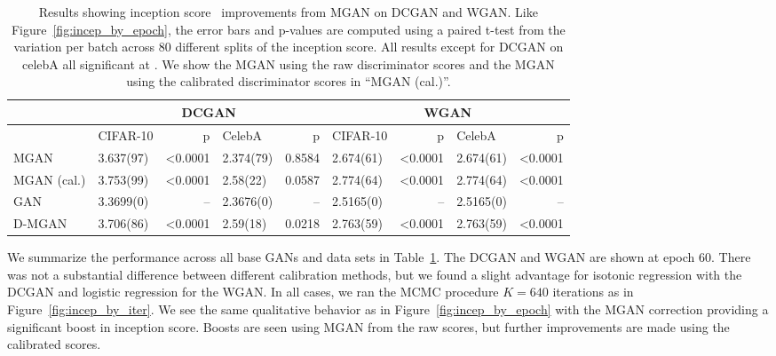 \documentclass{article}
\begin{document}
\begin{table}[htbp]
\centering
    \caption{{\small
    Results showing inception score~\citep{Salimans2016} improvements from MGAN on DCGAN and WGAN\@.
    Like Figure~\ref{fig:incep_by_epoch}, the error bars and p-values are computed using a paired t-test from the variation per batch across 80 different splits of the inception score.
    All results except for DCGAN on celebA all significant at .
    We show the MGAN using the raw discriminator scores and the MGAN using the calibrated discriminator scores in ``MGAN (cal.)''.
    }}
    \label{tbl:inception}
{\scriptsize
\begin{tabular}{|l|l|r|l|r||l|r|l|r|}
\toprule
~                 & \multicolumn{4}{c}{DCGAN}                               & \multicolumn{4}{c}{WGAN} \\
\toprule
~                 & CIFAR-10         &      p   & CelebA         &      p   & CIFAR-10        &      p   & CelebA        &      p \\
\midrule
MGAN              &        3.637(97) &  <0.0001 &      2.374(79) &  0.8584  &       2.674(61) &  <0.0001 &     2.674(61) &  <0.0001 \\
MGAN (cal.)       &        3.753(99) &  <0.0001 &      2.58(22)  &  0.0587  &       2.774(64) &  <0.0001 &     2.774(64) &  <0.0001 \\
GAN               &        3.3699(0) &       -- &      2.3676(0) &      --  &       2.5165(0) &       -- &     2.5165(0) &       -- \\
D-MGAN            &        3.706(86) &  <0.0001 &      2.59(18)  &  0.0218  &       2.763(59) &  <0.0001 &     2.763(59) &  <0.0001 \\
\bottomrule
\end{tabular}
}
\end{table}

We summarize the performance across all base GANs and data sets in Table~\ref{tbl:inception}.
The DCGAN and WGAN are shown at epoch 60.
There was not a substantial difference between different calibration methods, but we found a slight advantage for isotonic regression with the DCGAN and logistic regression for the WGAN\@.
In all cases, we ran the MCMC procedure $K=640$ iterations as in Figure~\ref{fig:incep_by_iter}.
We see the same qualitative behavior as in Figure~\ref{fig:incep_by_epoch} with the MGAN correction providing a significant boost in inception score.
Boosts are seen using MGAN from the raw scores, but further improvements are made using the calibrated scores.
\end{document}
